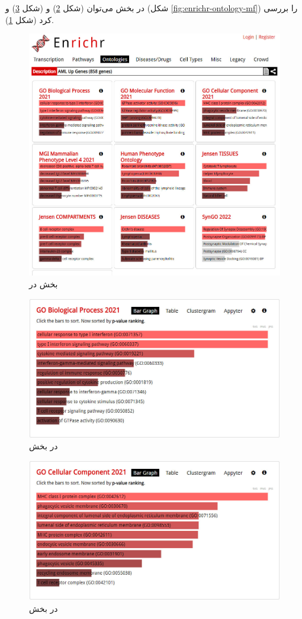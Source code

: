 \documentclass{article}
\begin{document}
در بخش  می‌توان  (شکل \ref{fig:enrichr-ontology-bp}) و  (شکل \ref{fig:enrichr-ontology-cc}) و  (شکل \ref{fig:enrichr-ontology-mf}) را بررسی کرد (شکل \ref{fig:enrichr-ontology}).
\begin{figure}[h!]
	\centering
	\includegraphics[width=0.5\columnwidth]{figs/enrichr-ontologies.jpg}
	\caption{بخش  در }
	\label{fig:enrichr-ontology}
\end{figure}

\begin{figure}[h!]
	\centering
	\includegraphics[width=0.5\columnwidth]{figs/enrichr-ontologies-bp.jpg}
	\caption{ در بخش }
	\label{fig:enrichr-ontology-bp}
\end{figure}

\begin{figure}[h!]
	\centering
	\includegraphics[width=0.5\columnwidth]{figs/enrichr-ontologies-cc.jpg}
	\caption{ در بخش }
	\label{fig:enrichr-ontology-cc}
\end{figure}
\end{document}
